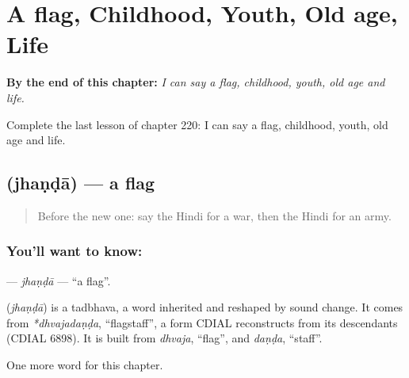 
\chapter{A flag, Childhood, Youth, Old age, Life}
\label{ch:hi-a-flag-childhood-youth-old-age-life}

\begin{chapteropening}
\textbf{By the end of this chapter:} \emph{I can say a flag, childhood, youth, old age and life.}

Complete the last lesson of chapter 220: I can say a flag, childhood, youth, old age and life.
\end{chapteropening}

\section[\texorpdfstring{\hi{झंडा} (jhaṇḍā)}{झंडा (jhaṇḍā)}]{ (jhaṇḍā) — a flag}

\label{lesson:HI-C220-jhanda}



\begin{quote}
Before the new one: say the Hindi for a war, then the Hindi for an army.
\end{quote}

\subsection*{You'll want to know: }
\textbf{} — \emph{jhaṇḍā} — \textquotedblleft{}a flag\textquotedblright{}.

\begin{cousinweb}
\textbf{} (\emph{jhaṇḍā}) is a tadbhava, a word inherited and reshaped by sound change. It comes from \emph{*dhvajadaṇḍa}, \textquotedblleft{}flagstaff\textquotedblright{}, a form CDIAL reconstructs from its descendants (CDIAL 6898). It is built from \emph{dhvaja}, \textquotedblleft{}flag\textquotedblright{}, and \emph{daṇḍa}, \textquotedblleft{}staff\textquotedblright{}.
\end{cousinweb}

\begin{grammarlens}[title={What you've built}]
One more word for this chapter.
\end{grammarlens}

